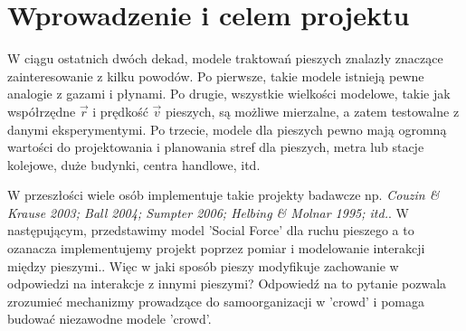 \chapter{Wprowadzenie i celem projektu}
\hspace{4ex}W ciągu ostatnich dwóch dekad, modele traktowań pieszych znalazły znaczące zainteresowanie z kilku powodów. Po pierwsze, takie modele istnieją pewne analogie z gazami i płynami. Po drugie, wszystkie wielkości modelowe, takie jak współrzędne $\vec{r}$ i prędkość $\vec{v}$ pieszych, są możliwe mierzalne, a zatem testowalne z danymi eksperymentymi. Po trzecie, modele dla pieszych pewno mają ogromną wartości do projektowania i planowania stref dla pieszych, metra lub stacje kolejowe, duże budynki, centra handlowe, itd.
\par \medskip
W przeszłości wiele osób implementuje takie projekty badawcze np. 
\textit{Couzin \& Krause 2003; Ball 2004; Sumpter 2006; Helbing \& Molnar 1995; itd.}. W następującym, przedstawimy model 'Social Force' dla ruchu pieszego a to ozanacza implementujemy projekt poprzez pomiar i modelowanie interakcji między pieszymi.. Więc w jaki sposób pieszy modyfikuje zachowanie w odpowiedzi na interakcje z innymi pieszymi? Odpowiedź na to pytanie pozwala zrozumieć mechanizmy prowadzące do samoorganizacji w 'crowd' i pomaga budować niezawodne modele 'crowd'.
